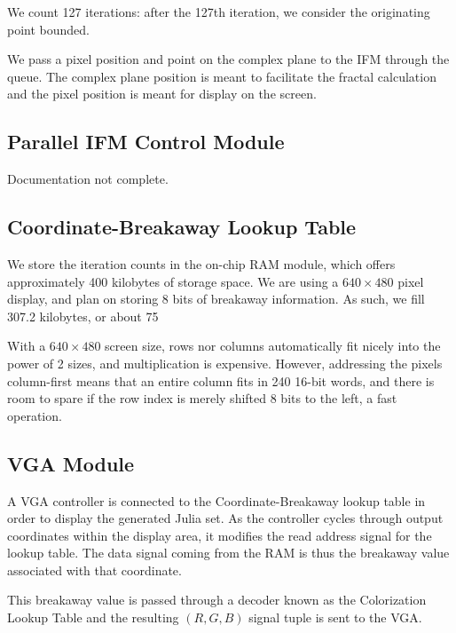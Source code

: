 \documentclass{article}
\begin{document}
We count 127 iterations: after the 127th iteration, we consider the
originating point bounded.

We pass a pixel position and point on the complex plane to the IFM
through the queue. The complex plane position is meant to
facilitate the fractal calculation and the pixel position is meant for
display on the screen.

\subsection{Parallel IFM Control Module}

Documentation not complete.

\subsection{Coordinate-Breakaway Lookup Table}

We store the iteration counts in the on-chip RAM module, which offers approximately 400 kilobytes of storage space.
We are using a $640 \times 480$ pixel display, and plan on storing 8 bits of breakaway information. As such, we fill  307.2 kilobytes, or about 75%



With a $640 \times 480$ screen size, rows nor columns automatically fit
nicely into the power of 2 sizes, and multiplication is
expensive. However, addressing the pixels column-first means that an
entire column fits in 240 16-bit words, and there is room to spare if
the row index is merely shifted 8 bits to the left, a fast operation.

\subsection{VGA Module}

A VGA controller is connected to the Coordinate-Breakaway lookup table in order to display the generated Julia set. As the controller cycles through output coordinates within the display area, it modifies the read address signal for the lookup table. The data signal coming from the RAM is thus the breakaway value associated with that coordinate.

This breakaway value is passed through a decoder known as the Colorization Lookup Table and the resulting $(R, G, B)$ signal tuple is sent to the VGA.

\end{document}

